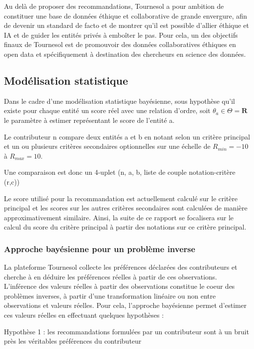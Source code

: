 Au delà de proposer des recommandations, Tournesol a pour ambition de constituer une base de données éthique et collaborative de grande envergure, afin de devenir un standard de facto et de montrer qu'il est possible d'allier éthique et IA et de guider les entités privés à emboîter le pas. Pour cela, un des objectifs finaux de Tournesol est de promouvoir des données collaboratives éthiques en open data et spécifiquement à destination des chercheurs en science des données.

\subsection{Modélisation statistique}

Dans le cadre d'une modélisation statistique bayésienne, sous hypothèse qu'il existe pour chaque entité un score réel avec une relation d'ordre, soit $\theta_{a}\in\Theta=\mathbf{R}$ le paramètre à estimer représentant le score de l'entité a.

Le contributeur n compare deux entités a et b en notant selon un critère principal et un ou plusieurs critères secondaires optionnelles sur une échelle de $R_{min}=-10$ à $R_{max}=10$.

Une comparaison est donc un 4-uplet (n, a, b, liste de couple notation-critère (r,c))

Le score utilisé pour la recommandation est actuellement calculé sur le critère principal et les scores sur les autres critères secondaires sont calculées de manière approximativement similaire. Ainsi, la suite de ce rapport se focalisera sur le calcul du score du critère principal à partir des notations sur ce critère principal.


\subsubsection{Approche bayésienne pour un problème inverse}

La plateforme Tournesol collecte les préférences déclarées des contributeurs et cherche à en déduire les préférences réelles à partir de ces observations. L'inférence des valeurs réelles à partir des observations constitue le coeur des problèmes inverses, à partir d'une transformation linéaire ou non entre observations et valeurs réelles. Pour cela, l'approche bayésienne permet d'estimer ces valeurs réelles en effectuant quelques hypothèses :


Hypothèse 1 : les recommandations formulées par un contributeur sont à un bruit près les véritables préférences du contributeur

